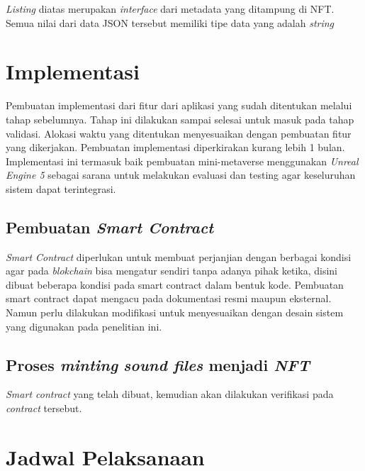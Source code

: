 \emph{Listing} diatas merupakan \emph{interface} dari metadata yang ditampung di NFT. Semua nilai dari data JSON tersebut
memiliki tipe data yang adalah \emph{string}

\section{Implementasi}

Pembuatan implementasi dari fitur dari aplikasi yang sudah ditentukan melalui tahap
sebelumnya. Tahap ini dilakukan sampai selesai untuk masuk pada tahap validasi. Alokasi
waktu yang ditentukan menyesuaikan dengan pembuatan fitur yang dikerjakan. Pembuatan
implementasi diperkirakan kurang lebih 1 bulan. Implementasi ini termasuk baik pembuatan mini-metaverse
menggunakan \emph{Unreal Engine 5} sebagai sarana untuk melakukan evaluasi dan testing agar keseluruhan sistem dapat terintegrasi.

\subsection{Pembuatan \emph{Smart Contract}}
\emph{Smart Contract} diperlukan untuk membuat perjanjian dengan
berbagai kondisi agar pada \emph{blokchain} bisa mengatur sendiri tanpa
adanya pihak ketika, disini dibuat beberapa kondisi pada
smart contract dalam bentuk kode. Pembuatan smart contract dapat mengacu pada dokumentasi resmi maupun eksternal.
Namun perlu dilakukan modifikasi untuk menyesuaikan dengan desain sistem yang digunakan pada penelitian
ini.

\subsection{Proses \emph{minting} \emph{sound files} menjadi \emph{NFT}}
\emph{Smart contract} yang telah dibuat, kemudian akan dilakukan verifikasi pada \emph{contract} tersebut.

\section{Jadwal Pelaksanaan}


